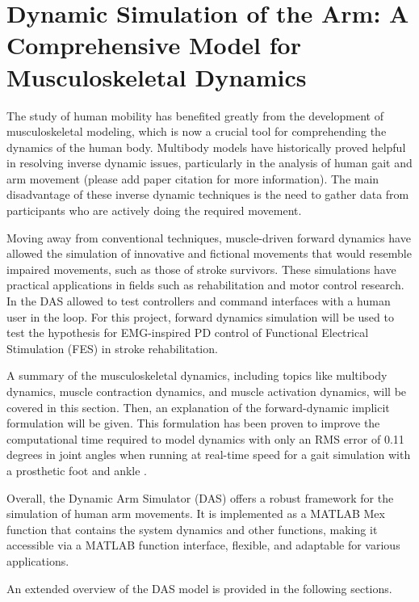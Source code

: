 \newpage
\section{Dynamic Simulation of the Arm: A Comprehensive Model for Musculoskeletal Dynamics}
The study of human mobility has benefited greatly from the development of musculoskeletal modeling, which is now a crucial tool for comprehending the dynamics of the human body. Multibody models have historically proved helpful in resolving inverse dynamic issues, particularly in the analysis of human gait and arm movement (please add paper citation for more information). The main disadvantage of these inverse dynamic techniques is the need to gather data from participants who are actively doing the required movement.

Moving away from conventional techniques, muscle-driven forward dynamics have allowed the simulation of innovative and fictional movements that would resemble impaired movements, such as those of stroke survivors. These simulations have practical applications in fields such as rehabilitation and motor control research. In \cite{IMP} the DAS allowed to test controllers and command interfaces with a human user in the loop. For this project, forward dynamics simulation will be used to test the hypothesis for EMG-inspired PD control of Functional Electrical Stimulation (FES) in stroke rehabilitation. 

A summary of the musculoskeletal dynamics, including topics like multibody dynamics, muscle contraction dynamics, and muscle activation dynamics, will be covered in this section. Then, an explanation of the forward-dynamic implicit formulation will be given. This formulation has been proven to improve the computational time required to model dynamics with only an RMS error of 0.11 degrees in joint angles when running at real-time speed for a gait simulation with a prosthetic foot and ankle \cite{IMP}.

Overall, the Dynamic Arm Simulator (DAS) offers a robust framework for the simulation of human arm movements. It is implemented as a MATLAB Mex function that contains the system dynamics and other functions, making it accessible via a MATLAB function interface, flexible, and adaptable for various applications. 

An extended overview of the DAS model is provided in the following sections.

